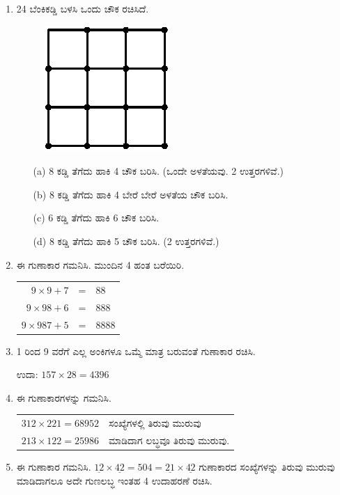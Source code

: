 \begin{enumerate}
\item 24 ಬೆಂಕಿಕಡ್ಡಿ ಬಳಸಿ ಒಂದು ಚೌಕ ರಚಿಸಿದೆ. 
\begin{figure}[H]
\centering
\includegraphics{images/chap11/q8.eps}
\end{figure}

\begin{itemize}
\item[(a)] 8 ಕಡ್ಡಿ ತೆಗೆದು ಹಾಕಿ 4 ಚೌಕ ಬರಿಸಿ. (ಒಂದೇ ಅಳತೆಯವು. 2 ಉತ್ತರಗಳಿವೆ.)
\item[(b)] 8 ಕಡ್ಡಿ ತೆಗೆದು ಹಾಕಿ 4 ಬೇರೆ ಬೇರೆ ಅಳತೆಯ ಚೌಕ ಬರಿಸಿ. 
\item[(c)] 6 ಕಡ್ಡಿ ತೆಗೆದು ಹಾಕಿ 6 ಚೌಕ ಬರಿಸಿ. 
\item[(d)] 8 ಕಡ್ಡಿ ತೆಗೆದು ಹಾಕಿ 5 ಚೌಕ ಬರಿಸಿ. (2 ಉತ್ತರಗಳಿವೆ.)
\end{itemize}

\item ಈ ಗುಣಾಕಾರ ಗಮನಿಸಿ. ಮುಂದಿನ 4 ಹಂತ ಬರೆಯಿರಿ. 

\begin{tabular}[t]{rcl}
$9\times 9 + 7$ & = & $88$\\
$9\times 98 + 6$ & = & $888$\\
$9\times 987 + 5$ & = & $8888$
\end{tabular}

\item 1 ರಿಂದ 9 ವರೆಗೆ ಎಲ್ಲ ಅಂಕಿಗಳೂ ಒಮ್ಮೆ ಮಾತ್ರ ಬರುವಂತೆ ಗುಣಾಕಾರ ರಚಿಸಿ. 

ಉದಾ: $157\times 28 = 4396$

\item ಈ ಗುಣಾಕಾರಗಳನ್ನು ಗಮನಿಸಿ. 

\begin{tabular}[t]{ll}
$312\times 221 = 68952$ & ಸಂಖ್ಯೆಗಳಲ್ಲಿ ತಿರುವು ಮುರುವು\\
$213\times 122 = 25986$ & ಮಾಡಿದಾಗ ಲಬ್ಧವೂ ತಿರುವು ಮುರುವು. 
\end{tabular}

\item ಈ ಗುಣಾಕಾರ ಗಮನಿಸಿ. $\underline{12}\times \underline{42} = 504 = \underline{21}\times \underline{42}$ ಗುಣಾಕಾರದ ಸಂಖ್ಯೆಗಳನ್ನು ತಿರುವು ಮುರುವು ಮಾಡಿದಾಗಲೂ ಅದೇ ಗುಣಲಬ್ಧ ಇಂತಹ 4 ಉದಾಹರಣೆ ರಚಿಸಿ. 


\end{enumerate}
